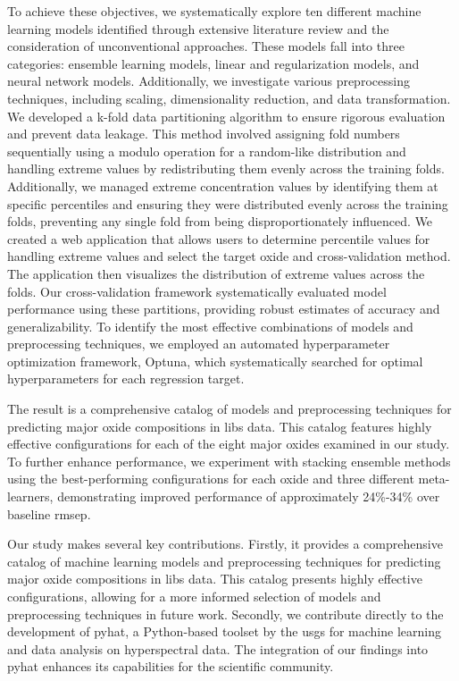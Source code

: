 \vspace{0.5em}

To achieve these objectives, we systematically explore ten different machine learning models identified through extensive literature review and the consideration of unconventional approaches.
These models fall into three categories: ensemble learning models, linear and regularization models, and neural network models.
Additionally, we investigate various preprocessing techniques, including scaling, dimensionality reduction, and data transformation.
We developed a k-fold data partitioning algorithm to ensure rigorous evaluation and prevent data leakage.
This method involved assigning fold numbers sequentially using a modulo operation for a random-like distribution and handling extreme values by redistributing them evenly across the training folds.
Additionally, we managed extreme concentration values by identifying them at specific percentiles and ensuring they were distributed evenly across the training folds, preventing any single fold from being disproportionately influenced.
We created a web application that allows users to determine percentile values for handling extreme values and select the target oxide and cross-validation method. The application then visualizes the distribution of extreme values across the folds.
Our cross-validation framework systematically evaluated model performance using these partitions, providing robust estimates of accuracy and generalizability.
To identify the most effective combinations of models and preprocessing techniques, we employed an automated hyperparameter optimization framework, Optuna, which systematically searched for optimal hyperparameters for each regression target.

\vspace{0.5em}

The result is a comprehensive catalog of models and preprocessing techniques for predicting major oxide compositions in \gls{libs} data.
This catalog features highly effective configurations for each of the eight major oxides examined in our study.
To further enhance performance, we experiment with stacking ensemble methods using the best-performing configurations for each oxide and three different meta-learners, demonstrating improved performance of approximately 24\%-34\% over baseline \gls{rmsep}.

\vspace{0.5em}

Our study makes several key contributions.
Firstly, it provides a comprehensive catalog of machine learning models and preprocessing techniques for predicting major oxide compositions in \gls{libs} data.
This catalog presents highly effective configurations, allowing for a more informed selection of models and preprocessing techniques in future work.
Secondly, we contribute directly to the development of \gls{pyhat}, a Python-based toolset by the \gls{usgs} for machine learning and data analysis on hyperspectral data.
The integration of our findings into \gls{pyhat} enhances its capabilities for the scientific community.

